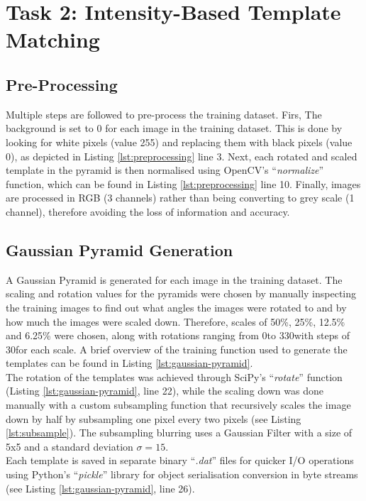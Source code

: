 \documentclass[a4paper,11pt,twocolumn]{article}
\begin{document}
\section{Task 2: Intensity-Based Template Matching}

\subsection{Pre-Processing}

Multiple steps are followed to pre-process the training dataset. Firs, The background is set to 0 for each image in the training dataset. This is done by looking for white pixels (value 255) and replacing them with black pixels (value 0), as depicted in Listing \ref{lst:preprocessing} line 3. Next, each rotated and scaled template in the pyramid is then normalised using OpenCV's ``\textit{normalize}'' function, which can be found in Listing \ref{lst:preprocessing} line 10. Finally, images are processed in RGB (3 channels) rather than being converting to grey scale (1 channel), therefore avoiding the loss of information and accuracy.

\subsection{Gaussian Pyramid Generation}

A Gaussian Pyramid is generated for each image in the training dataset. The scaling and rotation values for the pyramids were chosen by manually inspecting the training images to find out what angles the images were rotated to and by how much the images were scaled down. Therefore, scales of 50\%, 25\%, 12.5\% and 6.25\% were chosen, along with rotations ranging from 0\degree to 330\degree with steps of 30\degree for each scale. A brief overview of the training function used to generate the templates can be found in Listing \ref{lst:gaussian-pyramid}.\\

The rotation of the templates was achieved through SciPy's ``\textit{rotate}'' function (Listing \ref{lst:gaussian-pyramid}, line 22), while the scaling down was done manually with a custom subsampling function that recursively scales the image down by half by subsampling one pixel every two pixels (see Listing \ref{lst:subsample}). The subsampling blurring uses a Gaussian Filter with a size of 5x5 and a standard deviation $\sigma=15$.\\

Each template is saved in separate binary ``\textit{.dat}'' files for quicker I/O operations using Python's ``\textit{pickle}'' library for object serialisation conversion in byte streams (see Listing \ref{lst:gaussian-pyramid}, line 26).
\end{document}
